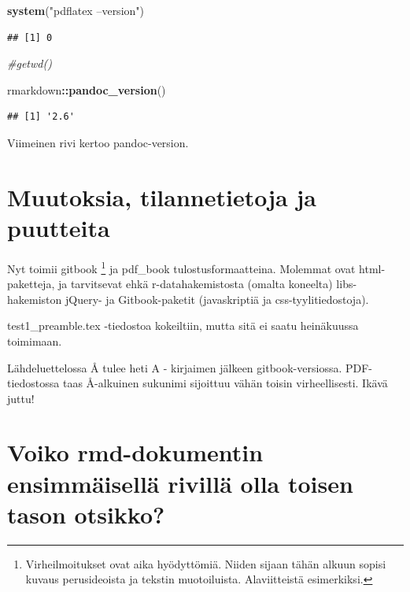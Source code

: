 \documentclass[finnish,]{book}
\newenvironment{Shaded}{\begin{snugshade}}{\end{snugshade}}
\newcommand{\CommentTok}[1]{\textcolor[rgb]{0.56,0.35,0.01}{\textit{#1}}}
\newcommand{\KeywordTok}[1]{\textcolor[rgb]{0.13,0.29,0.53}{\textbf{#1}}}
\newcommand{\NormalTok}[1]{#1}
\newcommand{\OperatorTok}[1]{\textcolor[rgb]{0.81,0.36,0.00}{\textbf{#1}}}
\newcommand{\StringTok}[1]{\textcolor[rgb]{0.31,0.60,0.02}{#1}}
\let\rmarkdownfootnote\footnote%
\def\footnote{\protect\rmarkdownfootnote}
\begin{document}
\begin{Shaded}
\begin{Highlighting}[]
\KeywordTok{system}\NormalTok{(}\StringTok{"pdflatex --version"}\NormalTok{)}
\end{Highlighting}
\end{Shaded}

\begin{verbatim}
## [1] 0
\end{verbatim}

\begin{Shaded}
\begin{Highlighting}[]
\CommentTok{#getwd()}

\NormalTok{rmarkdown}\OperatorTok{::}\KeywordTok{pandoc_version}\NormalTok{()}
\end{Highlighting}
\end{Shaded}

\begin{verbatim}
## [1] '2.6'
\end{verbatim}

Viimeinen rivi kertoo pandoc-version.

\hypertarget{muutoksia-tilannetietoja-ja-puutteita}{%
\section{Muutoksia, tilannetietoja ja puutteita}\label{muutoksia-tilannetietoja-ja-puutteita}}

Nyt toimii gitbook \footnote{Virheilmoitukset ovat aika hyödyttömiä. Niiden sijaan tähän alkuun sopisi kuvaus perusideoista ja tekstin muotoiluista. Alaviitteistä esimerkiksi.} ja pdf\_book tulostusformaatteina. Molemmat ovat html-paketteja, ja tarvitsevat ehkä r-datahakemistosta (omalta koneelta) libs-hakemiston jQuery- ja Gitbook-paketit (javaskriptiä ja css-tyylitiedostoja).

test1\_preamble.tex -tiedostoa kokeiltiin, mutta sitä ei saatu heinäkuussa toimimaan.

Lähdeluettelossa Å tulee heti A - kirjaimen jälkeen gitbook-versiossa. PDF-tiedostossa taas Å-alkuinen sukunimi sijoittuu vähän toisin virheellisesti. Ikävä juttu!

\hypertarget{voiko-rmd-dokumentin-ensimmaisella-rivilla-olla-toisen-tason-otsikko}{%
\section{Voiko rmd-dokumentin ensimmäisellä rivillä olla toisen tason otsikko?}\label{voiko-rmd-dokumentin-ensimmaisella-rivilla-olla-toisen-tason-otsikko}}
\end{document}
